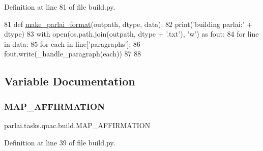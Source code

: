 Definition at line 81 of file build.\+py.


\begin{DoxyCode}
81 \textcolor{keyword}{def }\hyperlink{namespaceparlai_1_1tasks_1_1quac_1_1build_a08c212462b5c58cde91192d35f24f0cc}{make\_parlai\_format}(outpath, dtype, data):
82     print(\textcolor{stringliteral}{'building parlai:'} + dtype)
83     with open(os.path.join(outpath, dtype + \textcolor{stringliteral}{'.txt'}), \textcolor{stringliteral}{'w'}) \textcolor{keyword}{as} fout:
84         \textcolor{keywordflow}{for} line \textcolor{keywordflow}{in} data:
85             \textcolor{keywordflow}{for} each \textcolor{keywordflow}{in} line[\textcolor{stringliteral}{'paragraphs'}]:
86                 fout.write(\_handle\_paragraph(each))
87 
88 
\end{DoxyCode}


\subsection{Variable Documentation}
\mbox{\label{namespaceparlai_1_1tasks_1_1quac_1_1build_a65c0c865dad4567a45699d1069d1a923}} 
\subsubsection{\texorpdfstring{M\+A\+P\+\_\+\+A\+F\+F\+I\+R\+M\+A\+T\+I\+ON}{MAP\_AFFIRMATION}}
{\footnotesize\ttfamily parlai.\+tasks.\+quac.\+build.\+M\+A\+P\+\_\+\+A\+F\+F\+I\+R\+M\+A\+T\+I\+ON}



Definition at line 39 of file build.\+py.

\mbox{\label{namespaceparlai_1_1tasks_1_1quac_1_1build_ab5c463960c37a8cb5c2057aa7d15e537}} 
